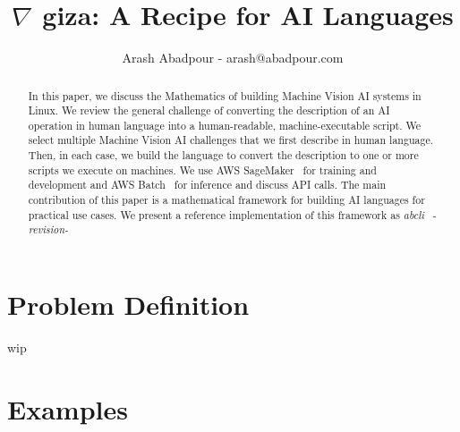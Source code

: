 \documentclass{article}
\title{$\nabla$ giza: A Recipe for AI Languages}
\author{Arash Abadpour - arash@abadpour.com}
\begin{document}
\maketitle

\begin{abstract}
In this paper, we discuss the Mathematics of building Machine Vision AI systems in Linux. We review the general challenge of converting the description of an AI operation in human language into a human-readable, machine-executable script. We select multiple Machine Vision AI challenges that we first describe in human language. Then, in each case, we build the language to convert the description to one or more scripts we execute on machines. We use AWS SageMaker~\cite{aws_sage_maker} for training and development and AWS Batch~\cite{aws_batch} for inference and discuss API calls. The main contribution of this paper is a mathematical framework for building AI languages for practical use cases. We present a reference implementation of this framework as \emph{abcli}~\cite{abcli} - \emph{revision-\revision}
\end{abstract}

\tableofcontents

\section{Problem Definition}

wip

\section{Examples}




\end{document}
